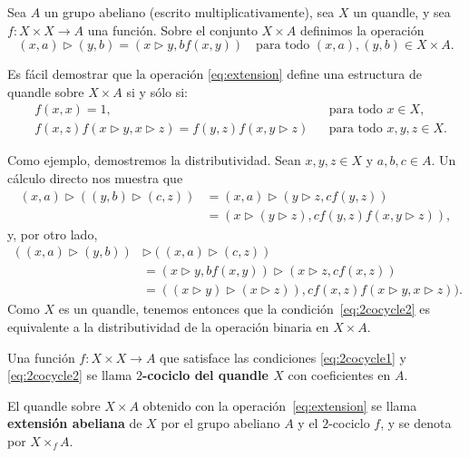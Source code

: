 \documentclass[graybox]{svmult}
\begin{document}
Sea $A$ un grupo abeliano (escrito multiplicativamente), sea $X$ un quandle, y sea 
$f\colon X\times X\to A$ una función. Sobre el conjunto $X\times A$ definimos la
operación
\begin{equation}
	\label{eq:extension}
	(x,a)\triangleright (y,b)=(x\triangleright y, bf(x,y))\quad\text{para todo $(x,a),(y,b)\in X\times A$}.
\end{equation}

Es fácil demostrar que la operación \eqref{eq:extension} define una
estructura de quandle sobre $X\times A$ si y sólo si:
\begin{align}
	\label{eq:2cocycle1}&f(x,x)=1,&&\text{para todo $x\in X$},\\
	\label{eq:2cocycle2}&f(x,z)f(x\triangleright y,x\triangleright z)=f(y,z)f(x,y\triangleright z)&&\text{para todo $x,y,z\in X$}.
\end{align}

\medskip
Como ejemplo, demostremos la distributividad. Sean $x,y,z\in X$ y
$a,b,c\in A$. Un cálculo directo nos muestra que 
\begin{align*}
	(x,a)\triangleright( (y,b)\triangleright (c,z))&=(x,a)\triangleright (y\triangleright z, cf(y,z))\\
	&=(x\triangleright(y\triangleright z), cf(y,z)f(x,y\triangleright z)),
\end{align*}
y, por otro lado, 
\begin{align*}
	\left( (x,a)\triangleright(y,b) \right)&\triangleright \left( (x,a)\triangleright (c,z) \right)\\
	&=(x\triangleright y,bf(x,y))\triangleright (x\triangleright z, cf(x,z))\\
&=\left( (x\triangleright y)\triangleright (x\triangleright z) \right), cf(x,z)f(x\triangleright y,x\triangleright z)).
	\end{align*}
	Como $X$ es un quandle, tenemos entonces que la
	condición~\eqref{eq:2cocycle2} es equivalente a la distributividad de la
	operación binaria en $X\times A$.

	\begin{definition}
		Una función $f:X\times X\to A$ que satisface las condiciones
		\eqref{eq:2cocycle1} y \eqref{eq:2cocycle2} se llama \textbf{$2$-cociclo
		del quandle $X$} con coeficientes en $A$.  
	\end{definition}

	\begin{definition} 
		El quandle sobre $X\times A$ obtenido con la operación~\eqref{eq:extension} se 
		llama \textbf{extensión abeliana} de $X$ por el grupo abeliano $A$ y el
		$2$-cociclo $f$, y se denota por $X\times_{f}A$.  
	\end{definition}
\end{document}
